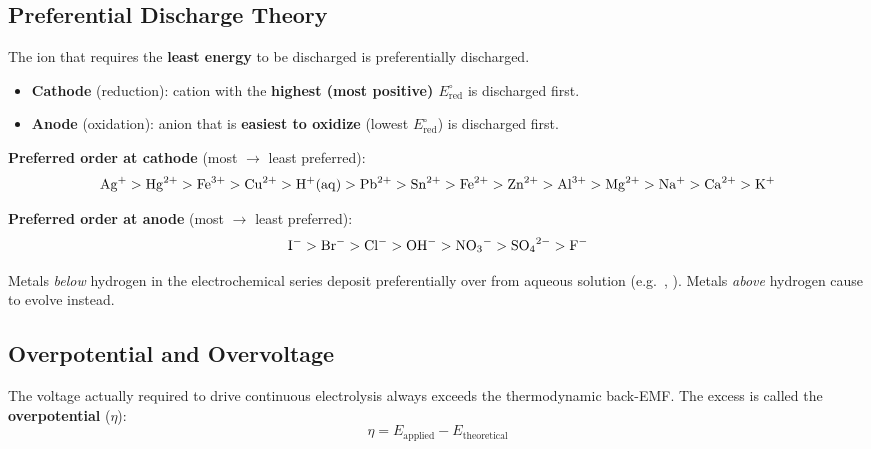 \subsection{Preferential Discharge Theory}

\begin{conceptbox}
The ion that requires the \textbf{least energy} to be discharged is preferentially discharged.
\begin{itemize}
    \item \textbf{Cathode} (reduction): cation with the \textbf{highest (most positive) $E^\circ_{\text{red}}$} is discharged first.
    \item \textbf{Anode} (oxidation): anion that is \textbf{easiest to oxidize} (lowest $E^\circ_{\text{red}}$) is discharged first.
\end{itemize}
\end{conceptbox}

\textbf{Preferred order at cathode} (most $\to$ least preferred):
\[
\ce{Ag+} > \ce{Hg^2+} > \ce{Fe^3+} > \ce{Cu^2+} > \ce{H+(aq)} > \ce{Pb^2+} > \ce{Sn^2+} > \ce{Fe^2+} > \ce{Zn^2+} > \ce{Al^3+} > \ce{Mg^2+} > \ce{Na+} > \ce{Ca^2+} > \ce{K+}
\]

\textbf{Preferred order at anode} (most $\to$ least preferred):
\[
\ce{I-} > \ce{Br-} > \ce{Cl-} > \ce{OH-} > \ce{NO3-} > \ce{SO4^2-} > \ce{F-}
\]

Metals \textit{below} hydrogen in the electrochemical series deposit preferentially over  from aqueous solution (e.g.\ , ). Metals \textit{above} hydrogen cause  to evolve instead.

\subsection{Overpotential and Overvoltage}
\label{subsec:overpotential}

The voltage actually required to drive continuous electrolysis always exceeds the thermodynamic back-EMF. The excess is called the \textbf{overpotential} ($\eta$):
\begin{equation}
    \boxed{\eta = E_{\text{applied}} - E_{\text{theoretical}}}
\end{equation}

